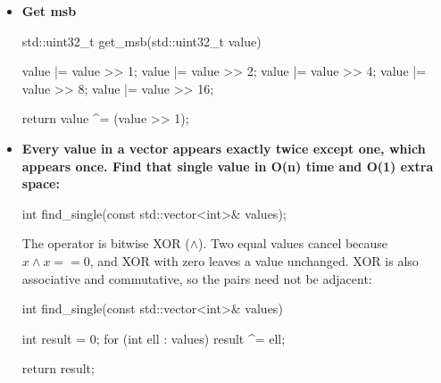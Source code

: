 \documentclass{report}
\begin{document}
\begin{itemize}
\begin{cppcode}
                unsigned count_set_bits(std::uint32_t value) {
                    unsigned count{};
                    while (value != 0) {
                        value &= value-1;
                        ++count;
                    }
                    return count;
                } 
            \end{cppcode}
        \item \textbf{Get msb}
            \bigbreak \noindent 
            \begin{cppcode}
                std::uint32_t get_msb(std::uint32_t value) {
                    value |= value >> 1;
                    value |= value >> 2;
                    value |= value >> 4;
                    value |= value >> 8;
                    value |= value >> 16;

                    return value ^= (value >> 1);
                }
            \end{cppcode}
        \item \textbf{Every value in a vector appears exactly twice except one, which appears once. Find that single value in O(n) time and O(1) extra space:}
            \bigbreak \noindent 
            \begin{cppcode}
            int find_single(const std::vector<int>& values);
            \end{cppcode}
            \bigbreak \noindent 
            The operator is bitwise XOR ($\land$). Two equal values cancel because $x \land x == 0$, and XOR with zero leaves a value unchanged. XOR is also associative and commutative, so the pairs need not be adjacent:
            \bigbreak \noindent 
            \begin{cppcode}
                int find_single(const std::vector<int>& values) {
                    int result = 0;
                    for (int ell : values) {
                        result ^= ell;
                    }

                    return result;
                }
            \end{cppcode}

    \end{itemize}
\end{document}
